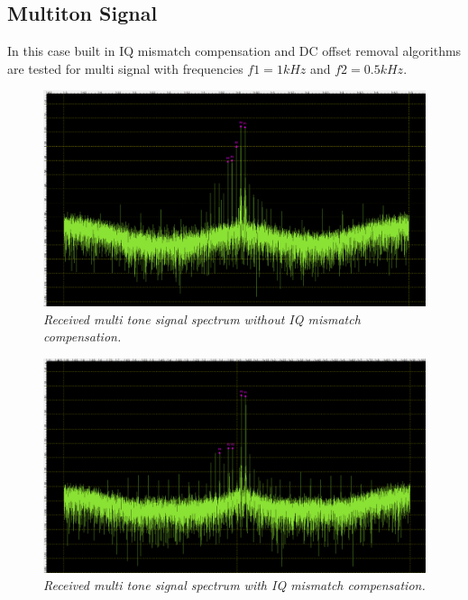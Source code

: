 \documentclass[en,printmode]{mgr}
\begin{document}
   	\subsection*{Multiton Signal}
   		In this case built in IQ mismatch compensation and DC offset removal algorithms are
	 	tested for multi signal with frequencies $f1=1kHz$ and $f2=0.5kHz$.
   		 	\begin{figure}[H]
    			\centering
   				\includegraphics[width=\textwidth]{plots/real_multi_off.png}
   		 		\caption{\textit{Received multi tone signal spectrum without IQ mismatch compensation.}}
   		 	\end{figure}
   		 	\vspace{0.5cm}
   		 	\begin{figure}[H]
    			\centering
   				\includegraphics[width=\textwidth]{plots/real_multi_on.png}
   		 		\caption{\textit{Received multi tone signal spectrum with IQ mismatch compensation.}}
   		 	\end{figure}
   	 \newpage	
\end{document}
